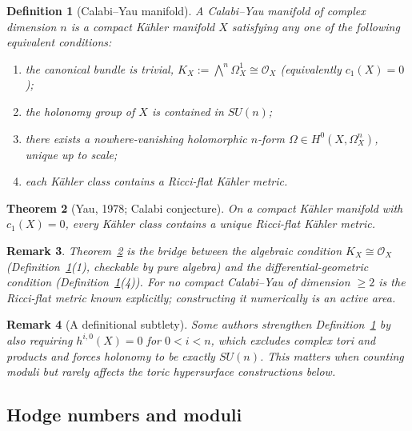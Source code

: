 \documentclass{amsart}
\newtheorem{theorem}{Theorem}[section]
\newtheorem{definition}[theorem]{Definition}
\newtheorem{remark}[theorem]{Remark}
\begin{document}
\begin{definition}[Calabi--Yau manifold]\label{def:cy}
A \emph{Calabi--Yau manifold} of complex dimension $n$ is a compact
K\"ahler manifold $X$ satisfying any one of the following equivalent
conditions:
\begin{enumerate}
  \item the canonical bundle is trivial,
        $K_X := \bigwedge^n \Omega_X^1 \cong \mathcal{O}_X$
        (equivalently $c_1(X) = 0$);
  \item the holonomy group of $X$ is contained in $SU(n)$;
  \item there exists a nowhere-vanishing holomorphic $n$-form
        $\Omega \in H^0(X,\Omega_X^n)$, unique up to scale;
  \item each K\"ahler class contains a Ricci-flat K\"ahler metric.
\end{enumerate}
\end{definition}

\begin{theorem}[Yau, 1978; Calabi conjecture]\label{thm:yau}
On a compact K\"ahler manifold with $c_1(X)=0$, every K\"ahler class
contains a \emph{unique} Ricci-flat K\"ahler metric.
\end{theorem}

\begin{remark}
Theorem~\ref{thm:yau} is the bridge between the algebraic condition
$K_X \cong \mathcal{O}_X$ (Definition~\ref{def:cy}(1), checkable by pure
algebra) and the differential-geometric condition (Definition~\ref{def:cy}(4)).
For no compact Calabi--Yau of dimension $\geq 2$ is the Ricci-flat metric
known explicitly; constructing it numerically is an active area.
\end{remark}

\begin{remark}[A definitional subtlety]
Some authors strengthen Definition~\ref{def:cy} by also requiring
$h^{i,0}(X)=0$ for $0<i<n$, which excludes complex tori and products and
forces holonomy to be \emph{exactly} $SU(n)$. This matters when counting
moduli but rarely affects the toric hypersurface constructions below.
\end{remark}

\subsection{Hodge numbers and moduli}
\end{document}
